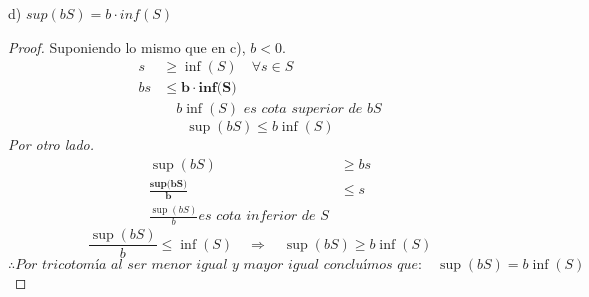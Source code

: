 \documentclass{article}
\begin{document}
  d) \(sup(bS)=b\cdot inf(S)\) \\
\begin{proof}
    Suponiendo lo mismo que en c), \(b<0\).
    \begin{align*}
        s &\geq \inf(S) \quad \forall s \in S\\
        bs &\leq \textbf{b} \cdot \textbf{inf(S)} \\
        &\quad b\inf(S) \textit{ es cota superior de bS}
    \end{align*}
    \[ \sup(bS) \leq b\inf(S) \]
    \textit{Por otro lado.}
    \begin{align*}
        \sup(bS) &\geq bs \\
        \frac{\textbf{sup(bS)}}{\textbf{b}} &\leq s \\
        \frac{\sup(bS)}{b} \textit{es cota inferior de S}&
    \end{align*}
    \[ \frac{\sup(bS)}{b} \leq \inf(S) \quad \Rightarrow \quad \sup(bS) \geq b\inf(S) \]
    \[ \therefore \textit{Por tricotomía al ser menor igual y mayor igual concluímos que:} \quad \sup(bS) = b\inf(S) \]
\end{proof}
\newpage
  
\end{document}
